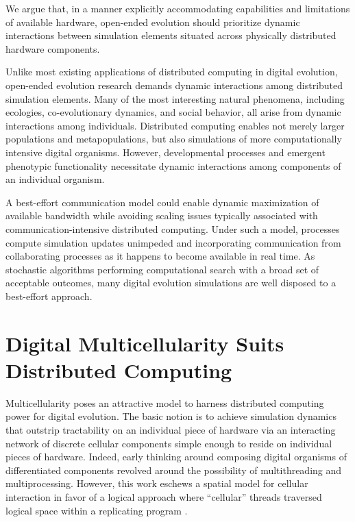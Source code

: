 We argue that, in a manner explicitly accommodating capabilities and limitations of available hardware, open-ended evolution should prioritize dynamic interactions between simulation elements situated across physically distributed hardware components.

Unlike most existing applications of distributed computing in digital evolution, open-ended evolution research demands dynamic interactions among distributed simulation elements.
Many of the most interesting natural phenomena, including ecologies, co-evolutionary dynamics, and social behavior, all arise from dynamic interactions among individuals.
Distributed computing enables not merely larger populations and metapopulations, but also simulations of more computationally intensive digital organisms.
However, developmental processes and emergent phenotypic functionality necessitate dynamic interactions among components of an individual organism.

A best-effort communication model could enable dynamic maximization of available bandwidth while avoiding scaling issues typically associated with communication-intensive distributed computing.
Under such a model, processes compute simulation updates unimpeded and incorporating communication from collaborating processes as it happens to become available in real time.
As stochastic algorithms performing computational search with a broad set of acceptable outcomes, many digital evolution simulations are well disposed to a best-effort approach.

\section{Digital Multicellularity Suits Distributed Computing}

Multicellularity poses an attractive model to harness distributed computing power for digital evolution.
The basic notion is to achieve simulation dynamics that outstrip tractability on an individual piece of hardware via an interacting network of discrete cellular components simple enough to reside on individual pieces of hardware.
Indeed, early thinking around composing digital organisms of differentiated components revolved around the possibility of multithreading and multiprocessing.
However, this work eschews a spatial model for cellular interaction in favor of a logical approach where ``cellular'' threads traversed logical space within a replicating program \citep{ofria1999evolution,ray2000evolution}.

